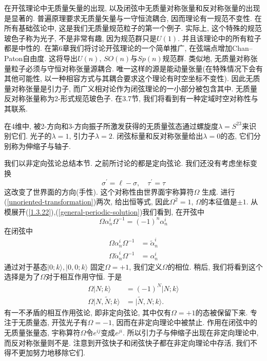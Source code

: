 在开弦理论中无质量矢量的出现, 以及闭弦中无质量对称张量和反对称张量的出现是显著的. 普遍原理要求无质量矢量与一守恒流耦合, 因而理论有一规范不变性. 在所有基础弦论中, 这是我们无质量规范粒子的第一个例子. 实际上, 这个特殊的规范玻色子称为光子, 不是非常有趣, 因为规范群只是$U(1)$. 并且该理论中的所有粒子都是中性的. 在第6章我们将讨论开弦理论的一个简单推广, 在弦端点增加Chan–Paton自由度. 这将导出$U(n)$, $SO(n)$与$Sp(n)$规范群. 类似地, 无质量对称张量粒子必须与守恒对称张量源耦合. 唯一这样的源是能动量张量(在特殊情况下会有其他可能性, 以一种相容方式与其耦合要求这个理论有时空坐标不变性). 因此无质量对称张量是引力子, 而广义相对论作为闭弦理论的一小部分被包含其中. 无质量反对称张量称为2-形式规范玻色子. 在3.7节, 我们将看到有一种定域时空对称性与其联系. 

在4维中, 被2-方向和3-方向振子所激发获得的无质量弦态通过螺旋度$\lambda=S^{23}$来识别它们. 光子的$\lambda=1$, 引力子$\lambda=2$. 闭弦标量和反对称张量给出$\lambda=0$的态, 它们分别称为伸缩子与轴子. 

我们以非定向弦论总结本节. 之前所讨论的都是定向弦论. 我们还没有考虑坐标变换
\begin{equation}
\sigma^{\prime}=\ell-\sigma, \quad \tau^{\prime}=\tau \label{unoriented-transformation}
\end{equation}
这改变了世界面的方向(手性). 这个对称性由世界面宇称算符$\Omega$ 生成. 进行(\ref{unoriented-transformation})两次, 给出恒等式, 因此$\Omega^2=1$, $\Omega$的本征值是$\pm 1$. 从模展开(\ref{1.3.22}),(\ref{general-periodic-solution})我们看到, 在开弦中
\begin{equation}
\Omega \alpha_{n}^{i} \Omega^{-1}=(-1)^{n} \alpha_{n}^{i}
\end{equation}
在闭弦中
\begin{subequations}
\begin{align}
\Omega \alpha_{n}^{i} \Omega^{-1}&=\tilde{\alpha}_{n}^{i}\\
\Omega \tilde{\alpha}_{n}^{i} \Omega^{-1}&=\alpha_{n}^{i}
\end{align}
\end{subequations}
通过对于基态$|0;k\rangle,|0,0;k\rangle$ 固定$\Omega=+1$, 我们定义$\Omega$的相位.  稍后, 我们将看到这个选择是为了$\Omega$对于相互作用守恒. 于是
\begin{subequations}
\begin{align}
\Omega|N ; k\rangle&=(-1)^{N}|N ; k\rangle \\
\Omega|N, \tilde{N} ; k\rangle&=|\tilde{N}, N ; k\rangle.
\end{align}
\end{subequations}
有一不矛盾的相互作用弦论, 即非定向弦论, 其中仅有$\Omega=+1$的态被保留下来. 专注于无质量态, 开弦光子有$\Omega=-1$,  因而在非定向理论中被禁止. 作用在闭弦中的无质量张量态, 宇称算符$\Omega$令$e^{ij}$变成$e^{ji}$. 所以引力子与伸缩子出现在非定向理论中, 而反对称张量则不是. 注意到开弦快子和闭弦快子都在非定向理论中存活, 我们不得不更加努力地移除它们. 

